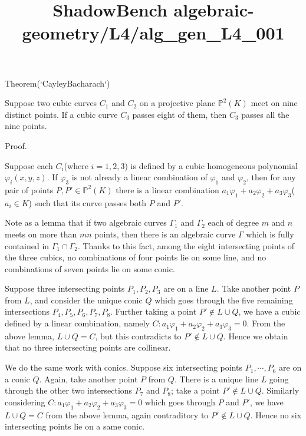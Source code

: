 \documentclass{article}
\title{ShadowBench algebraic-geometry/L4/alg\_gen\_L4\_001}
\begin{document}
\maketitle

Theorem(`CayleyBacharach`)

Suppose two cubic curves $C_1$ and $C_2$ on a projective plane $\mathbb{P}^2(K)$ meet on nine distinct points. If a cubic curve $C_3$ passes eight of them, then $C_3$ passes all the nine points.

Proof.

Suppose each $C_i$(where $i = 1, 2, 3$) is defined by a cubic homogeneous polynomial $\varphi_i(x, y, z)$. If $\varphi_3$ is not already a linear combination of $\varphi_1$ and $\varphi_2$, then for any pair of points $P, P' \in \mathbb{P}^2(K)$ there is a linear combination $a_1\varphi_1 + a_2\varphi_2 + a_3\varphi_3$($a_i \in K$) such that its curve passes both $P$ and $P'$.

Note as a lemma that if two algebraic curves $\Gamma_1$ and $\Gamma_2$ each of degree $m$ and $n$ meets on more than $mn$ points, then there is an algebraic curve $\Gamma$ which is fully contained in $\Gamma_1 \cap \Gamma_2$. Thanks to this fact, among the eight intersecting points of the three cubics, no combinations of four points lie on some line, and no combinations of seven points lie on some conic.

Suppose three intersecting points $P_1, P_2, P_3$ are on a line $L$. Take another point $P$ from $L$, and consider the unique conic $Q$ which goes through the five remaining intersections $P_4, P_5, P_6, P_7, P_8$. Further taking a point $P' \notin L \cup Q$, we have a cubic defined by a linear combination, namely $C : a_1 \varphi_1 + a_2 \varphi_2 + a_3 \varphi_3 = 0$. From the above lemma, $L \cup Q = C$, but this contradicts to $P' \notin L \cup Q$. Hence we obtain that no three intersecting points are collinear.

We do the same work with conics. Suppose six intersecting points $P_1, \cdots, P_6$ are on a conic $Q$. Again, take another point $P$ from $Q$. There is a unique line $L$ going through the other two intersections $P_7$ and $P_8$; take a point $P' \notin L \cup Q$. Similarly considering $C : a_1 \varphi_1 + a_2 \varphi_2 + a_3 \varphi_3 = 0$ which goes through $P$ and $P'$, we have $L \cup Q = C$ from the above lemma, again contraditory to $P' \notin L \cup Q$. Hence no six intersecting points lie on a same conic.
\end{document}
